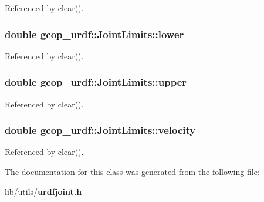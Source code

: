 \-Referenced by clear().

\subsubsection[{lower}]{\setlength{\rightskip}{0pt plus 5cm}double {\bf gcop\-\_\-urdf\-::\-Joint\-Limits\-::lower}}\label{classgcop__urdf_1_1JointLimits_a8b6704a195993b50bf01ebad826b2dab}


\-Referenced by clear().

\subsubsection[{upper}]{\setlength{\rightskip}{0pt plus 5cm}double {\bf gcop\-\_\-urdf\-::\-Joint\-Limits\-::upper}}\label{classgcop__urdf_1_1JointLimits_af3ede00d488301c4e3cf57687f67c8db}


\-Referenced by clear().

\subsubsection[{velocity}]{\setlength{\rightskip}{0pt plus 5cm}double {\bf gcop\-\_\-urdf\-::\-Joint\-Limits\-::velocity}}\label{classgcop__urdf_1_1JointLimits_addded9098f92abf78c65b53a1dd614e3}


\-Referenced by clear().



\-The documentation for this class was generated from the following file\-:\begin{DoxyCompactItemize}
\item 
lib/utils/{\bf urdfjoint.\-h}\end{DoxyCompactItemize}
